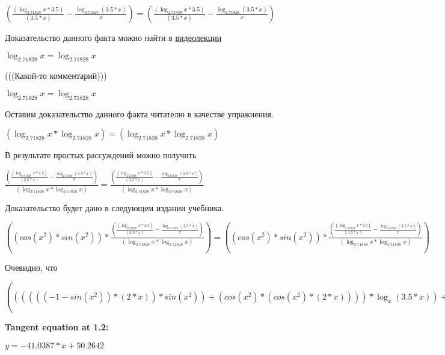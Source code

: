 \documentclass[12pt,a4paper,fleqn]{article}
\theoremstyle{definition}
\begin{document}
$(\frac{(\log_{ 2.71828 }{ x } *  3.5 )}{( 3.5  *  x )}
 - \frac{\log_{ 2.71828 }{( 3.5  *  x )}}{ x }
) = (\frac{(\log_{ 2.71828 }{ x } *  3.5 )}{( 3.5  *  x )}
 - \frac{\log_{ 2.71828 }{( 3.5  *  x )}}{ x }
)$

Доказательство данного факта можно найти в \href{https://www.youtube.com/watch?v=dQw4w9WgXcQ}{видеолекции}

$\log_{ 2.71828 }{ x } = \log_{ 2.71828 }{ x }$

(((Какой-то комментарий)))

$\log_{ 2.71828 }{ x } = \log_{ 2.71828 }{ x }$

Оставим доказательство данного факта читателю в качестве упражнения.

$(\log_{ 2.71828 }{ x } * \log_{ 2.71828 }{ x }) = (\log_{ 2.71828 }{ x } * \log_{ 2.71828 }{ x })$

В результате простых рассуждений можно получить

$\frac{(\frac{(\log_{ 2.71828 }{ x } *  3.5 )}{( 3.5  *  x )}
 - \frac{\log_{ 2.71828 }{( 3.5  *  x )}}{ x }
)}{(\log_{ 2.71828 }{ x } * \log_{ 2.71828 }{ x })}
 = \frac{(\frac{(\log_{ 2.71828 }{ x } *  3.5 )}{( 3.5  *  x )}
 - \frac{\log_{ 2.71828 }{( 3.5  *  x )}}{ x }
)}{(\log_{ 2.71828 }{ x } * \log_{ 2.71828 }{ x })}
$

Доказательство будет дано в следующем издании учебника.

$((cos({ x }^{ 2 }) * sin({ x }^{ 2 })) * \frac{(\frac{(\log_{ 2.71828 }{ x } *  3.5 )}{( 3.5  *  x )}
 - \frac{\log_{ 2.71828 }{( 3.5  *  x )}}{ x }
)}{(\log_{ 2.71828 }{ x } * \log_{ 2.71828 }{ x })}
) = ((cos({ x }^{ 2 }) * sin({ x }^{ 2 })) * \frac{(\frac{(\log_{ 2.71828 }{ x } *  3.5 )}{( 3.5  *  x )}
 - \frac{\log_{ 2.71828 }{( 3.5  *  x )}}{ x }
)}{(\log_{ 2.71828 }{ x } * \log_{ 2.71828 }{ x })}
)$

Очевидно, что

$(((((( -1  - sin({ x }^{ 2 })) * ( 2  *  x )) * sin({ x }^{ 2 })) + (cos({ x }^{ 2 }) * (cos({ x }^{ 2 }) * ( 2  *  x )))) * \log_{ x }{( 3.5  *  x )}) + ((cos({ x }^{ 2 }) * sin({ x }^{ 2 })) * \frac{(\frac{(\log_{ 2.71828 }{ x } *  3.5 )}{( 3.5  *  x )}
 - \frac{\log_{ 2.71828 }{( 3.5  *  x )}}{ x }
)}{(\log_{ 2.71828 }{ x } * \log_{ 2.71828 }{ x })}
)) = (((((( -1  - sin({ x }^{ 2 })) * ( 2  *  x )) * sin({ x }^{ 2 })) + (cos({ x }^{ 2 }) * (cos({ x }^{ 2 }) * ( 2  *  x )))) * \log_{ x }{( 3.5  *  x )}) + ((cos({ x }^{ 2 }) * sin({ x }^{ 2 })) * \frac{(\frac{(\log_{ 2.71828 }{ x } *  3.5 )}{( 3.5  *  x )}
 - \frac{\log_{ 2.71828 }{( 3.5  *  x )}}{ x }
)}{(\log_{ 2.71828 }{ x } * \log_{ 2.71828 }{ x })}
))$


\textbf{Tangent equation at 1.2:}

$y = -41.0387 * x + 50.2642$
\end{document}
